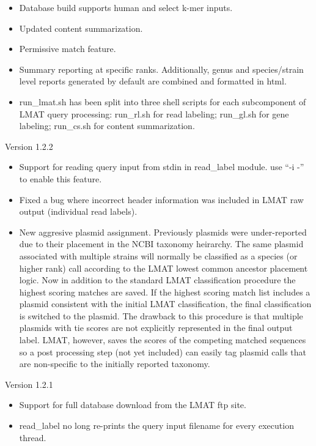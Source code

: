 \documentclass[11pt]{article}
\begin{document}
\begin{itemize}
\item 
Database build supports human and select k-mer inputs.
\item 
Updated content summarization.
\item
Permissive match feature.
\item
Summary reporting at specific ranks.  Additionally, genus and species/strain level reports generated by default are combined and formatted in html.
\item
run\_lmat.sh has been split into three shell scripts for each subcomponent of LMAT query processing:  run\_rl.sh for read labeling;  run\_gl.sh for gene labeling;  run\_cs.sh for content summarization.



\end{itemize}

Version 1.2.2
\begin{itemize} 
\item
Support for reading query input from stdin in read\_label module.  use ``-i -'' to enable this feature.
\item
Fixed a bug where incorrect header information was included in LMAT raw output (individual read labels).
\item New aggresive plasmid assignment.  Previously plasmids were under-reported due to their placement in the NCBI taxonomy heirarchy. The same plasmid associated with multiple strains will normally be classified as a species (or higher rank) call according to the LMAT lowest common ancestor placement logic. Now in addition to the standard LMAT classification procedure the highest scoring matches are saved.  If the highest scoring match list includes a plasmid consistent with the initial LMAT classification, the final classification is switched to the plasmid.  The drawback
to this procedure is that multiple plasmids with tie scores are not explicitly represented in the final output label. LMAT, however, saves the scores of the competing matched sequences so a post processing step (not yet included) can easily tag plasmid calls that are non-specific to the initially reported taxonomy. \end{itemize}


Version 1.2.1
\begin{itemize}
\item
Support for full database download from the LMAT ftp site.
\item
read\_label no long re-prints the query input filename for every execution thread.
\end{itemize}
\end{document}
